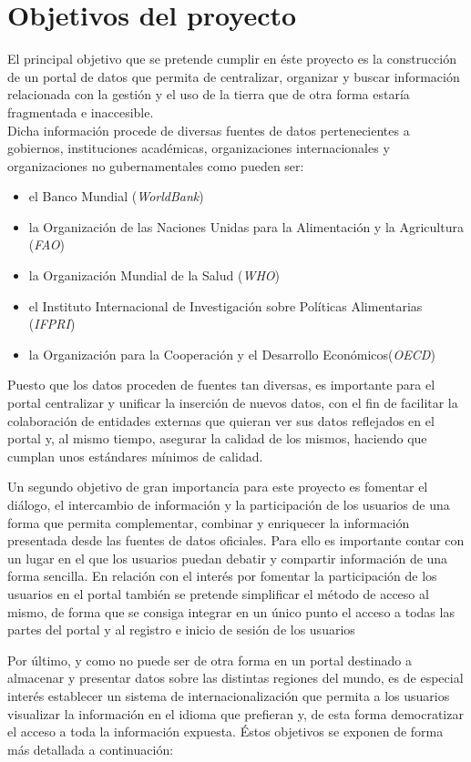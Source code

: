 {\section{Objetivos del proyecto}
\label{objetivos_proyecto}
El principal objetivo que se pretende cumplir en éste proyecto es la construcción de un portal de datos que permita de centralizar, organizar y buscar información relacionada con la gestión y el uso de la tierra que de otra forma estaría fragmentada e inaccesible.\\
Dicha información procede de diversas fuentes de datos pertenecientes a gobiernos, instituciones académicas, organizaciones internacionales y organizaciones no gubernamentales como pueden ser:
\begin{itemize}
\item el Banco Mundial (\textit{WorldBank})
\item la Organización de las Naciones Unidas para la Alimentación y la Agricultura (\textit{FAO})
\item la Organización Mundial de la Salud (\textit{WHO})
\item el Instituto Internacional de Investigación sobre Políticas Alimentarias (\textit{IFPRI})
\item la Organización para la Cooperación y el Desarrollo Económicos(\textit{OECD})
\end{itemize}
Puesto que los datos proceden de fuentes tan diversas, es importante para el portal centralizar y unificar la inserción de nuevos datos, con el fin de facilitar la colaboración de entidades externas que quieran ver sus datos reflejados en el portal y, al mismo tiempo, asegurar la calidad de los mismos, haciendo que cumplan unos estándares mínimos de calidad.

Un segundo objetivo de gran importancia para este proyecto es fomentar el diálogo, el intercambio de información y la participación de los usuarios de una forma que permita complementar, combinar y enriquecer la información presentada desde las fuentes de datos oficiales. Para ello es importante contar con un lugar en el que los usuarios puedan debatir y compartir información de una forma sencilla.\newline
En relación con el interés por fomentar la participación de los usuarios en el portal también se pretende simplificar el método de acceso al mismo, de forma que se consiga integrar en un único punto el acceso a todas las partes del portal y al registro e inicio de sesión de los usuarios

Por último, y como no puede ser de otra forma en un portal destinado a almacenar y presentar datos sobre las distintas regiones del mundo, es de especial interés establecer un sistema de internacionalización que permita a los usuarios visualizar la información en el idioma que prefieran y, de esta forma democratizar el acceso a toda la información expuesta.
Éstos objetivos se exponen de forma más detallada a continuación:



}
